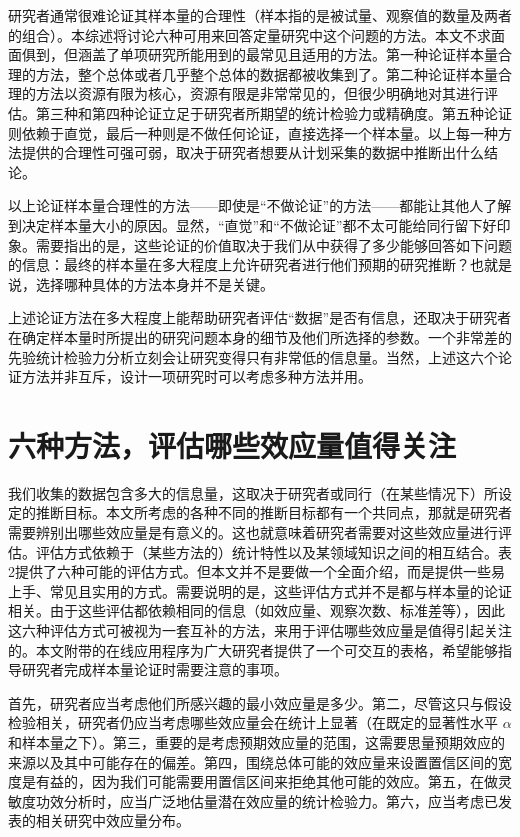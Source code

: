 \documentclass[
  letterpaper,
  DIV=11,
  numbers=noendperiod]{scrreprt}
\begin{document}
研究者通常很难论证其样本量的合理性（样本指的是被试量、观察值的数量及两者的组合）。本综述将讨论六种可用来回答定量研究中这个问题的方法。本文不求面面俱到，但涵盖了单项研究所能用到的最常见且适用的方法。第一种论证样本量合理的方法，整个总体或者几乎整个总体的数据都被收集到了。第二种论证样本量合理的方法以资源有限为核心，资源有限是非常常见的，但很少明确地对其进行评估。第三种和第四种论证立足于研究者所期望的统计检验力或精确度。第五种论证则依赖于直觉，最后一种则是不做任何论证，直接选择一个样本量。以上每一种方法提供的合理性可强可弱，取决于研究者想要从计划采集的数据中推断出什么结论。

以上论证样本量合理性的方法------即使是``不做论证''的方法------都能让其他人了解到决定样本量大小的原因。显然，``直觉''和``不做论证''都不太可能给同行留下好印象。需要指出的是，这些论证的价值取决于我们从中获得了多少能够回答如下问题的信息：最终的样本量在多大程度上允许研究者进行他们预期的研究推断？也就是说，选择哪种具体的方法本身并不是关键。

上述论证方法在多大程度上能帮助研究者评估``数据''是否有信息，还取决于研究者在确定样本量时所提出的研究问题本身的细节及他们所选择的参数。一个非常差的先验统计检验力分析立刻会让研究变得只有非常低的信息量。当然，上述这六个论证方法并非互斥，设计一项研究时可以考虑多种方法并用。

\hypertarget{ux516dux79cdux65b9ux6cd5ux8bc4ux4f30ux54eaux4e9bux6548ux5e94ux91cfux503cux5f97ux5173ux6ce8}{%
\section{六种方法，评估哪些效应量值得关注}\label{ux516dux79cdux65b9ux6cd5ux8bc4ux4f30ux54eaux4e9bux6548ux5e94ux91cfux503cux5f97ux5173ux6ce8}}

我们收集的数据包含多大的信息量，这取决于研究者或同行（在某些情况下）所设定的推断目标。本文所考虑的各种不同的推断目标都有一个共同点，那就是研究者需要辨别出哪些效应量是有意义的。这也就意味着研究者需要对这些效应量进行评估。评估方式依赖于（某些方法的）统计特性以及某领域知识之间的相互结合。表2提供了六种可能的评估方式。但本文并不是要做一个全面介绍，而是提供一些易上手、常见且实用的方式。需要说明的是，这些评估方式并不是都与样本量的论证相关。由于这些评估都依赖相同的信息（如效应量、观察次数、标准差等），因此这六种评估方式可被视为一套互补的方法，来用于评估哪些效应量是值得引起关注的。本文附带的在线应用程序为广大研究者提供了一个可交互的表格，希望能够指导研究者完成样本量论证时需要注意的事项。

首先，研究者应当考虑他们所感兴趣的最小效应量是多少。第二，尽管这只与假设检验相关，研究者仍应当考虑哪些效应量会在统计上显著（在既定的显著性水平
\(\alpha\)
和样本量之下）。第三，重要的是考虑预期效应量的范围，这需要思量预期效应的来源以及其中可能存在的偏差。第四，围绕总体可能的效应量来设置置信区间的宽度是有益的，因为我们可能需要用置信区间来拒绝其他可能的效应。第五，在做灵敏度功效分析时，应当广泛地估量潜在效应量的统计检验力。第六，应当考虑已发表的相关研究中效应量分布。
\end{document}
